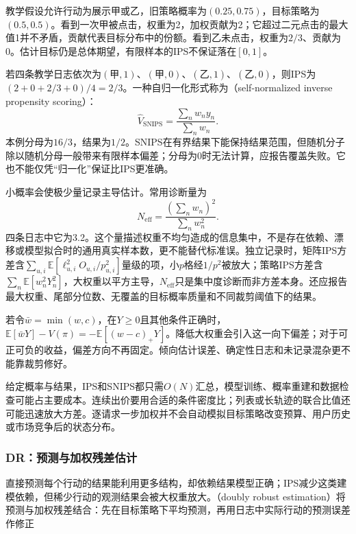 教学假设允许行动为展示甲或乙，旧策略概率为$(0.25,0.75)$，目标策略为$(0.5,0.5)$。看到一次甲被点击，权重为2，加权贡献为2；它超过二元点击的最大值1并不矛盾，贡献代表目标分布中的份额。看到乙未点击，权重为$2/3$、贡献为0。估计目标仍是总体期望，有限样本的IPS不保证落在$[0,1]$。

若四条教学日志依次为$(\text{甲},1)$、$(\text{甲},0)$、$(\text{乙},1)$、$(\text{乙},0)$，则IPS为$(2+0+2/3+0)/4=2/3$。一种自归一化形式称为（self-normalized inverse propensity scoring）：
\begin{equation}
  \widehat V_{\mathrm{SNIPS}}
     =\frac{\sum_nw_ny_n}{\sum_nw_n}.
  \label{eq:rs-evaluation-snips}
\end{equation}
本例分母为$16/3$，结果为$1/2$。SNIPS在有界结果下能保持结果范围，但随机分子除以随机分母一般带来有限样本偏差；分母为0时无法计算，应报告覆盖失败。它也不能仅凭“归一化”保证比IPS更准确。

小概率会使极少量记录主导估计。常用诊断量为
\begin{equation}
  N_{\mathrm{eff}}
    =\frac{(\sum_n w_n)^2}{\sum_nw_n^2}.
  \label{eq:rs-evaluation-weight-ess}
\end{equation}
四条日志中它为3.2。这个量描述权重不均匀造成的信息集中，不是存在依赖、漂移或模型拟合时的通用真实样本数，更不能替代标准误。独立记录时，矩阵IPS方差含$\sum_{u,i}\mathbb E[\ell_{u,i}^2O_{u,i}/p_{u,i}^2]$量级的项，小$p$格经$1/p^2$被放大；策略IPS方差含$\sum_n\mathbb E[w_n^2Y_n^2]$，大权重以平方主导，$N_{\mathrm{eff}}$只是集中度诊断而非方差本身。还应报告最大权重、尾部分位数、无覆盖的目标概率质量和不同裁剪阈值下的结果。

若令$\bar w=\min(w,c)$，在$Y\geq0$且其他条件正确时，$\mathbb E[\bar wY]-V(\pi)=-\mathbb E[(w-c)_+Y]$。降低大权重会引入这一向下偏差；对于可正可负的收益，偏差方向不再固定。倾向估计误差、确定性日志和未记录混杂更不能靠裁剪修好。

给定概率与结果，IPS和SNIPS都只需$O(N)$汇总，模型训练、概率重建和数据检查可能占主要成本。连续出价要用合适的条件密度比；列表或长轨迹的联合比值还可能迅速放大方差。逐请求一步加权并不会自动模拟目标策略改变预算、用户历史或市场竞争后的状态分布。

\Needspace{90mm}
\subsubsection{DR：预测与加权残差估计}
\label{sec:rs-evaluation-dr}

直接预测每个行动的结果能利用更多结构，却依赖结果模型正确；IPS减少这类建模依赖，但稀少行动的观测结果会被大权重放大。（doubly robust estimation）将预测与加权残差结合：先在目标策略下平均预测，再用日志中实际行动的预测误差作修正

